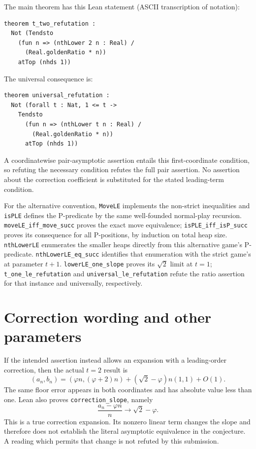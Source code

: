\documentclass[11pt]{article}
\begin{document}
The main theorem has this Lean statement (ASCII transcription of notation):
\begin{lstlisting}
theorem t_two_refutation :
  Not (Tendsto
    (fun n => (nthLower 2 n : Real) /
      (Real.goldenRatio * n))
    atTop (nhds 1))
\end{lstlisting}
The universal consequence is:
\begin{lstlisting}
theorem universal_refutation :
  Not (forall t : Nat, 1 <= t ->
    Tendsto
      (fun n => (nthLower t n : Real) /
        (Real.goldenRatio * n))
      atTop (nhds 1))
\end{lstlisting}
A coordinatewise pair-asymptotic assertion entails this first-coordinate condition, so refuting the necessary condition refutes the full pair assertion. No assertion about the correction coefficient is substituted for the stated leading-term condition.

For the alternative convention, \texttt{MoveLE} implements the non-strict
inequalities and \texttt{isPLE} defines the P-predicate by the same
well-founded normal-play recursion. \texttt{moveLE\_iff\_move\_succ} proves
the exact move equivalence; \texttt{isPLE\_iff\_isP\_succ} proves its
consequence for all P-positions, by induction on total heap size.
\texttt{nthLowerLE} enumerates the smaller heaps directly from this
alternative game's P-predicate. \texttt{nthLowerLE\_eq\_succ} identifies
that enumeration with the strict game's at parameter $t+1$.
\texttt{lowerLE\_one\_slope} proves its $\sqrt2$ limit at $t=1$;
\texttt{t\_one\_le\_refutation} and \texttt{universal\_le\_refutation}
refute the ratio assertion for that instance and universally, respectively.

\section{Correction wording and other parameters}\label{sec:correction}
If the intended assertion instead allows an expansion with a leading-order correction, then the actual $t=2$ result is
\[
(a_n,b_n)=(\varphi n,(\varphi+2)n)
 +(\sqrt2-\varphi)n(1,1)+O(1).
\]
The same floor error appears in both coordinates and has absolute value less than one. Lean also proves \texttt{correction\_slope}, namely
\[
\frac{a_n-\varphi n}{n}\longrightarrow\sqrt2-\varphi.
\]
This is a true correction expansion. Its nonzero linear term changes the slope and therefore does not establish the literal asymptotic equivalence in the conjecture. A reading which permits that change is not refuted by this submission.
\end{document}
